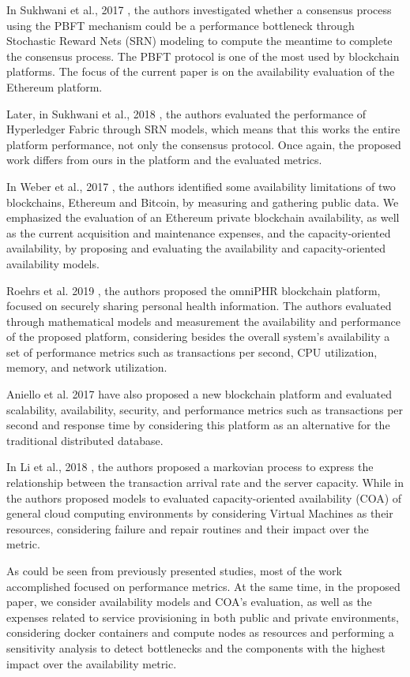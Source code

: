 In Sukhwani et al., 2017  \cite{sukhwani2017performance}, the authors investigated whether a consensus process using the PBFT mechanism could be a performance bottleneck through Stochastic Reward Nets (SRN) modeling to compute the meantime to complete the consensus process. The PBFT protocol is one of the most used by blockchain platforms. The focus of the current paper is on the availability evaluation of the Ethereum platform. 

Later, in Sukhwani et al., 2018 \cite{sukhwani2018performance}, the authors evaluated the performance of Hyperledger Fabric through SRN models, which means that this works the entire platform performance, not only the consensus protocol. Once again, the proposed work differs from ours in the platform and the evaluated metrics. 

In Weber et al., 2017 \cite{weber2017}, the authors identified some availability limitations of two blockchains, Ethereum and Bitcoin, by measuring and gathering public data. We emphasized the evaluation of an Ethereum private blockchain availability, as well as the current acquisition and maintenance expenses, and the capacity-oriented availability, by proposing and evaluating the availability and capacity-oriented availability models. 

Roehrs et al. 2019 \cite{roehrs2019}, the authors proposed the omniPHR blockchain platform, focused on securely sharing personal health information. The authors evaluated through mathematical models and measurement the availability and performance of the proposed platform, considering besides the overall system's availability a set of performance metrics such as transactions per second, CPU utilization, memory, and network utilization. 

Aniello et al. 2017 \cite{aniello2017} have also proposed a new blockchain platform and evaluated scalability, availability, security, and performance metrics such as transactions per second and response time by considering this platform as an alternative for the traditional distributed database.

In Li et al., 2018 \cite{li2018blockchain}, the authors proposed a markovian process to express the relationship between the transaction arrival rate and the server capacity. While in \cite{torquato2175models} the authors proposed models to evaluated capacity-oriented availability (COA) of general cloud computing environments by considering Virtual Machines as their resources, considering failure and repair routines and their impact over the metric. 

As could be seen from previously presented studies, most of the work accomplished focused on performance metrics. At the same time, in the proposed paper, we consider availability models and COA's evaluation, as well as the expenses related to service provisioning in both public and private environments, considering docker containers and compute nodes as resources and performing a sensitivity analysis to detect bottlenecks and the components with the highest impact over the availability metric.
